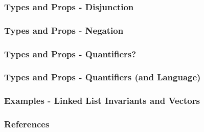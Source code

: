 \documentclass
  [hyperref={colorlinks = true,linkcolor = blue, 
             citecolor = blue, urlcolor = blue}
  ]{beamer}
\begin{document}
\begin{frame}[fragile]
  \frametitle{Types and Props - Disjunction}
\end{frame}

\begin{frame}[fragile]
  \frametitle{Types and Props - Negation}
\end{frame}

\begin{frame}[fragile]
  \frametitle{Types and Props - Quantifiers?}
\end{frame}

\begin{frame}[fragile]
  \frametitle{Types and Props - Quantifiers (and Language)}
\end{frame}

\begin{frame}[fragile]
  \frametitle{Examples - Linked List Invariants and Vectors}
\end{frame}

\begin{frame}[fragile]
\frametitle{References}
{}
\end{frame}
\end{document}
